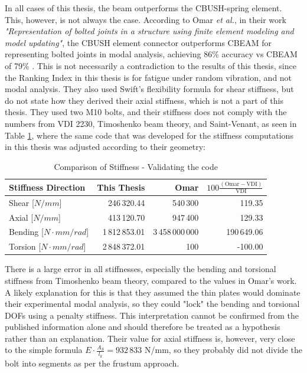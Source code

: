 \documentclass[a4paper,twoside]{bth}
\begin{document}
In all cases of this thesis, the beam outperforms the CBUSH-spring element. This, however, is not always the case. According to Omar \textit{et al.}, in their work \textit{"Representation of bolted joints in a structure using finite element modeling and model updating"}, the CBUSH element connector outperforms CBEAM for representing bolted joints in modal analysis, achieving 86\% accuracy vs CBEAM of 79\% \cite{noauthor_pdf_2025}. This is not necessarily a contradiction to the results of this thesis, since the Ranking Index in this thesis is for fatigue under random vibration, and not modal analysis. They also used Swift's flexibility formula for shear stiffness, but do not state how they derived their axial stiffness, which is not a part of this thesis. They used two M10 bolts, and their stiffness does not comply with the numbers from VDI 2230, Timoshenko beam theory, and Saint-Venant, as seen in Table \ref{tab:thesisVSOmar}, where the same code that was developed for the stiffness computations in this thesis was adjusted according to their geometry:

\begin{table}[H]
    \centering
    \caption{Comparison of Stiffness - Validating the code}
    \label{tab:thesisVSOmar}
    \begin{tabular}{lrrr}
        \toprule
        Stiffness Direction & This Thesis & Omar & $100 \tfrac{(\text{Omar}-\text{VDI})}{\text{VDI}}$ \\
        \midrule
        Shear [$N/mm$]   & 246\,320.44  & 540\,300      & 119.35  \\
        Axial [$N/mm$]   & 413\,120.70  & 947\,400      & 129.33  \\
        Bending [$N\cdot mm/rad$] & 1\,812\,853.01 & 3\,458\,000\,000 & 190\,649.06 \\
        Torsion [$N\cdot mm/rad$] & 2\,848\,372.01 & 100          & -100.00  \\
        \bottomrule
    \end{tabular}
\end{table}

There is a large error in all stiffnesses, especially the bending and torsional stiffness from Timoshenko beam theory, compared to the values in Omar's work. A likely explanation for this is that they assumed the thin plates would dominate their experimental modal analysis, so they could "lock" the bending and torsional \ac{DOF}s using a penalty stiffness. This interpretation cannot be confirmed from the published information alone and should therefore be treated as a hypothesis rather than an explanation. Their value for axial stiffness is, however, very close to the simple formula $E\cdot\tfrac{A_S}{l_k} = 932\,833$ N/mm, so they probably did not divide the bolt into segments as per the frustum approach. 
\end{document}
